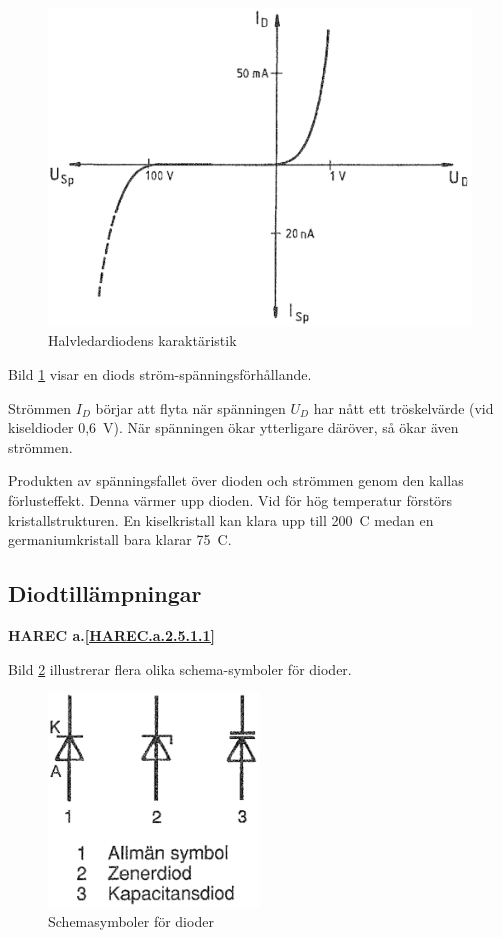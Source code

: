 \begin{figure}
\includegraphics[width=\textwidth]{images/cropped_pdfs/bild_2_2-13.pdf}
\caption{Halvledardiodens karaktäristik}
\label{fig:BildII2-13}
\end{figure}

Bild \ref{fig:BildII2-13} visar en diods ström-spänningsförhållande.

Strömmen \(I_D\) börjar att flyta när spänningen \(U_D\) har nått ett
tröskelvärde (vid kiseldioder 0,6~V).
När spänningen ökar ytterligare däröver, så ökar även strömmen.

Produkten av spänningsfallet över dioden och strömmen genom den kallas
förlusteffekt. Denna värmer upp dioden. Vid för hög temperatur förstörs
kristallstrukturen. En kiselkristall kan klara upp till 200~\degree C medan en
germaniumkristall bara klarar 75~\degree C.

\subsection{Diodtillämpningar}
\textbf{HAREC a.\ref{HAREC.a.2.5.1.1}\label{myHAREC.a.2.5.1.1}}

Bild \ref{fig:BildII2-14} illustrerar flera olika schema-symboler för
dioder.

\begin{figure}
\includegraphics[width=0.5\textwidth]{images/cropped_pdfs/bild_2_2-14.pdf}
\caption{Schemasymboler för dioder}
\label{fig:BildII2-14}
\end{figure}

